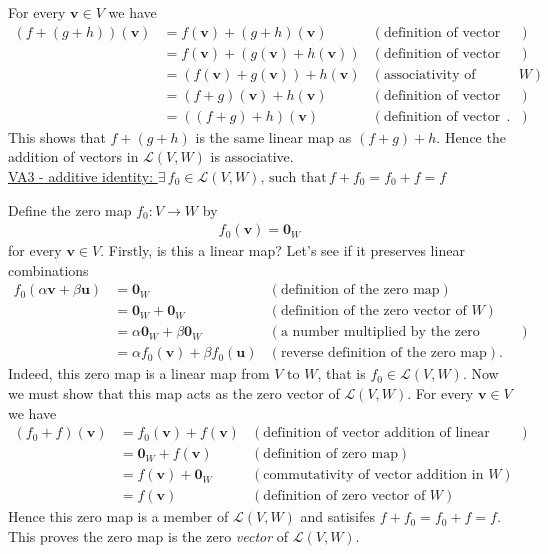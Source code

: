 \noindent For every $\mathbf{v}\in V$ we have
\begin{align*}
(f+(g+h))(\mathbf{v}) &= f(\mathbf{v})+(g+h)(\mathbf{v})  &  (\text{definition of vector addition of linear maps})\\
 &= f(\mathbf{v})+(g(\mathbf{v})+h(\mathbf{v}) )   &  (\text{definition of vector addition of linear maps})\\
 &= (f(\mathbf{v})+g(\mathbf{v}))+h(\mathbf{v})    &  (\text{associativity of vectors in $W$})\\
 &= (f+g)(\mathbf{v})+h(\mathbf{v})    &  (\text{definition of vector addition of linear maps})\\
 &= ((f+g)+h)(\mathbf{v})    &  (\text{definition of vector addition of linear maps}).
\end{align*}
This shows that $f+(g+h)$ is the same linear map as $(f+g)+h$. Hence the addition of vectors in $\mathcal{L}(V,W)$ is associative. \\


\noindent \underline{VA3 - additive identity: $\exists \, f_0 \in \mathcal{L}(V,W), \, \text{such that} \, f + f_0 = f_0 + f = f$}

\noindent Define the zero map $f_0: V \to W$ by
\begin{align*}
f_0(\mathbf{v}) = \mathbf{0}_W
\end{align*}
for every $\mathbf{v}\in V$. Firstly, is this a linear map? Let's see if it preserves linear combinations
\begin{align*}
f_0(\alpha \mathbf{v} + \beta \mathbf{u}) &= \mathbf{0}_W  &  (\text{definition of the zero map}) \\
%
 &= \mathbf{0}_W + \mathbf{0}_W  &  (\text{definition of the zero vector of $W$}) \\
%
 &= \alpha \mathbf{0}_W + \beta\mathbf{0}_W  &  (\text{a number multiplied by the zero vector is the zero vector})  \\
%
 &= \alpha f_0(\mathbf{v}) + \beta f_0(\mathbf{u})  &  (\text{reverse definition of the zero map}) .
\end{align*}
Indeed, this zero map is a linear map from $V$ to $W$, that is $f_0 \in \mathcal{L}(V,W)$. Now we must show that this map acts as the zero vector of $\mathcal{L}(V,W)$. For every $\mathbf{v}\in V$ we have
\begin{align*}
(f_0 + f)(\mathbf{v}) &= f_0(\mathbf{v})+f(\mathbf{v})  &  (\text{definition of vector addition of linear maps})\\
%
&= \mathbf{0}_W+f(\mathbf{v})  &  (\text{definition of zero map})\\
%
&= f(\mathbf{v})+\mathbf{0}_W  &  (\text{commutativity of vector addition in $W$})\\
%
&= f(\mathbf{v})  &  (\text{definition of zero vector of $W$})
\end{align*}
Hence this zero map is a member of $\mathcal{L}(V,W)$ and satisifes $f + f_0 = f_0 + f = f$. This proves the zero map is the zero \textit{vector} of $\mathcal{L}(V,W)$. \\


